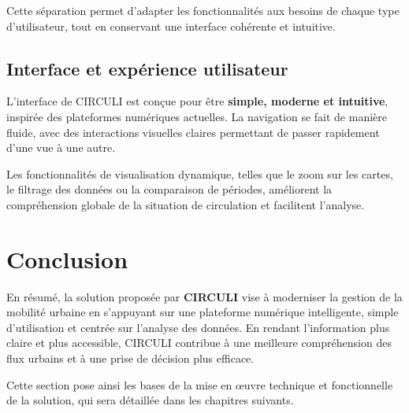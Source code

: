 Cette séparation permet d'adapter les fonctionnalités aux besoins de chaque type d'utilisateur, tout en conservant une interface cohérente et intuitive.

\subsection{Interface et expérience utilisateur}
L'interface de CIRCULI est conçue pour être \textbf{simple, moderne et intuitive}, inspirée des plateformes numériques actuelles. La navigation se fait de manière fluide, avec des interactions visuelles claires permettant de passer rapidement d'une vue à une autre.

Les fonctionnalités de visualisation dynamique, telles que le zoom sur les cartes, le filtrage des données ou la comparaison de périodes, améliorent la compréhension globale de la situation de circulation et facilitent l'analyse.

\section{Conclusion}
En résumé, la solution proposée par \textbf{CIRCULI} vise à moderniser la gestion de la mobilité urbaine en s'appuyant sur une plateforme numérique intelligente, simple d'utilisation et centrée sur l'analyse des données. En rendant l'information plus claire et plus accessible, CIRCULI contribue à une meilleure compréhension des flux urbains et à une prise de décision plus efficace.

Cette section pose ainsi les bases de la mise en œuvre technique et fonctionnelle de la solution, qui sera détaillée dans les chapitres suivants.
